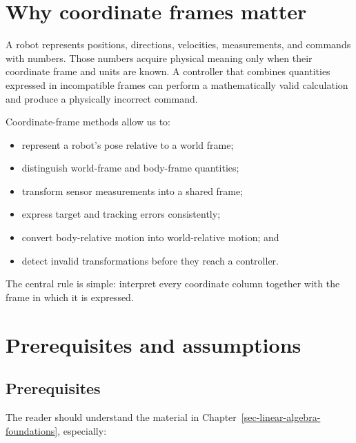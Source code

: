 \documentclass[
  australian,
  12pt,
  letterpaper,
  DIV=11,
  numbers=noendperiod,
  twoside]{scrreprt}
\providecommand{\tightlist}{%
  \setlength{\itemsep}{0pt}\setlength{\parskip}{0pt}}
\begin{document}
\section*{Why coordinate frames
matter}\label{why-coordinate-frames-matter}


A robot represents positions, directions, velocities, measurements, and
commands with numbers. Those numbers acquire physical meaning only when
their coordinate frame and units are known. A controller that combines
quantities expressed in incompatible frames can perform a mathematically
valid calculation and produce a physically incorrect command.

Coordinate-frame methods allow us to:

\begin{itemize}
\tightlist
\item
  represent a robot's pose relative to a world frame;
\item
  distinguish world-frame and body-frame quantities;
\item
  transform sensor measurements into a shared frame;
\item
  express target and tracking errors consistently;
\item
  convert body-relative motion into world-relative motion; and
\item
  detect invalid transformations before they reach a controller.
\end{itemize}

The central rule is simple: interpret every coordinate column together
with the frame in which it is expressed.

\section*{Prerequisites and
assumptions}\label{prerequisites-and-assumptions-1}


\subsection*{Prerequisites}\label{prerequisites-1}

The reader should understand the material in
Chapter~\ref{sec-linear-algebra-foundations}, especially:
\end{document}
